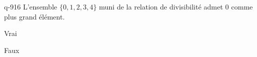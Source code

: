 \begin{truefalse}{q-916}
L'ensemble $\{0,1,2,3,4\}$ muni de la relation de divisibilité admet $0$ comme plus grand élément.
\item* Vrai
\item Faux
\end{truefalse}

